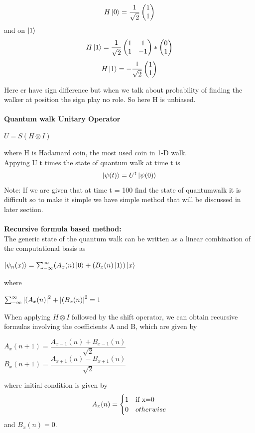 \documentclass[11 pt]{article}
\theoremstyle{definition}
\theoremstyle{remark}
\newcommand{\tens}[1]{
  \mathbin{\mathop{\otimes}\limits_{#1}}}
\begin{document}
$$H\ket{0} = \dfrac{1}{\sqrt{2}}\begin{pmatrix}
           1\\1
\end{pmatrix}$$
and on $\ket{1}$
$$H\ket{1}  = \dfrac{1}{\sqrt{2}}\begin{pmatrix}
           1 & 1\\
           1 & -1
\end{pmatrix} * \begin{pmatrix}
           0\\1
\end{pmatrix}$$
$$H\ket{1} = -\dfrac{1}{\sqrt{2}}\begin{pmatrix}
           1\\1
\end{pmatrix}$$

Here er have sign difference but when we talk about probability of finding the walker at position the sign play no role. So here H is unbiased.\\
\\
\textbf{Quantum walk Unitary Operator}
\begin{center}
    $U = S ( H \tens{} I)$
\end{center}
where H is Hadamard coin, the most used coin in 1-D walk.\\
Appying U t times the state of quantum walk at time t is $$\ket{\psi(t)} = U^t\ket{\psi(0)}$$
Note: If we are given that at time t = 100 find the state of quantumwalk it is difficult so to make it simple we have simple method that will be discussed in later section.\\
\\
\textbf{Recursive formula based method:}\\
The generic state of the quantum walk can be written as a linear combination of the computational basis as
\begin{center}
    $\ket{\psi_n(x)} = \sum_{-\infty}^{\infty} (A_{x}(n)\ket{0} +(B_{x}(n)\ket{1}) \ket{x}$
\end{center}
where 
\begin{center}
    $ \sum_{-\infty}^{\infty} \abs{(A_{x}(n)}^2 + \abs{(B_{x}(n)}^2 = 1$
\end{center}
When applying $H \tens{} I $ followed by the shift operator, we can obtain recursive formulas involving the coefficients A and B, which are given by
\begin{center}
    $A_{x}(n+1) = \dfrac{A_{x-1}(n) + B_{x-1}(n)}{\sqrt{2}}$\\
    $B_{x}(n+1) = \dfrac{A_{x+1}(n) - B_{x+1}(n)}{\sqrt{2}}$
\end{center}
where initial condition is given by
\[ 
A_{x}(n)=     \begin{cases} 
                    1 & $if x=0$\\
                    0 & otherwise
                \end{cases}
\]
and $B_{x}(n)=0$.
\end{document}
